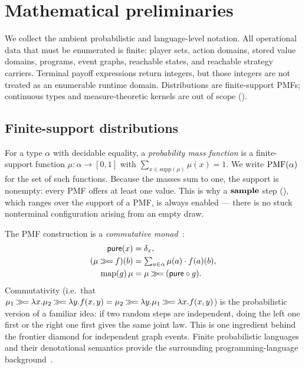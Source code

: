 \section{Mathematical preliminaries}
\label{sec:preliminaries}

We collect the ambient probabilistic and language-level notation.  All
operational data that must be enumerated is finite: player sets, action
domains, stored value domains, programs, event graphs, reachable states,
and reachable strategy carriers.  Terminal payoff expressions return
integers, but those integers are not treated as an enumerable runtime
domain.  Distributions are finite-support PMFs; continuous types and
measure-theoretic kernels are out of scope ().

\subsection{Finite-support distributions}
\label{sec:prelim:pmf}

\begin{definition}[PMF]
\label{def:pmf}
For a type $\alpha$ with decidable equality, a \emph{probability mass
function} is a finite-support function
$\mu : \alpha \to [0,1]$ with $\sum_{x \in \mathrm{supp}(\mu)} \mu(x)
= 1$.  We write $\mathrm{PMF}(\alpha)$ for the set of such functions.  Because the
masses sum to one, the support is nonempty: every PMF offers at least one
value.  This is why a $\mathbf{sample}$ step (), which ranges
over the support of a PMF, is always enabled --- there is no stuck
nonterminal configuration arising from an empty draw.
\end{definition}

The PMF construction is a \emph{commutative monad}~\citep{Giry1982,Moggi1991}:
\begin{align*}
  \mathsf{pure}(x)    &= \delta_x,\\
  (\mu \mathbin{\gg\!=} f)(b)    &= {\textstyle\sum_{a \in \alpha}}\,\mu(a)\cdot f(a)(b),\\
  \mathrm{map}(g)\,\mu &= \mu \mathbin{\gg\!=} (\mathsf{pure}\circ g).
\end{align*}
Commutativity (i.e.\ that $\mu_1 \mathbin{\gg\!=} \lambda x.\mu_2 \mathbin{\gg\!=} \lambda y.f(x,y)
= \mu_2 \mathbin{\gg\!=} \lambda y.\mu_1 \mathbin{\gg\!=} \lambda x.f(x,y)$) is the
probabilistic version of a familiar idea: if two random steps are
independent, doing the left one first or the right one first gives the
same joint law.  This is one ingredient behind the frontier diamond for
independent graph events.  Finite probabilistic languages and their
denotational semantics provide the surrounding programming-language
background~\citep{Kozen1981,GordonProbabilistic,BorgstromEtAl2016Fun}.

